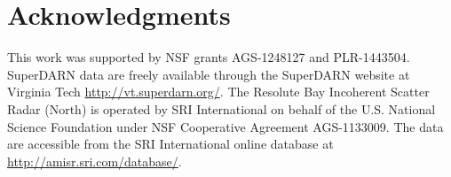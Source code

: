 %
%
%
%
%
%
%

\section*{Acknowledgments}
This work was supported by NSF grants AGS-1248127 and PLR-1443504.  SuperDARN data are freely available through the SuperDARN website at Virginia Tech \url{http://vt.superdarn.org/}.  The Resolute Bay Incoherent Scatter Radar (North) is operated by SRI International on behalf of the U.S. National Science Foundation under NSF Cooperative Agreement AGS-1133009.  The data are accessible from the SRI International online database at \url{http://amisr.sri.com/database/}.



%
%
%
%
%
%
%
%
%
%

